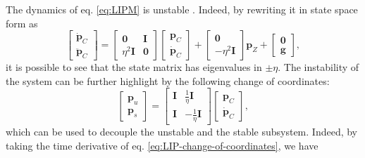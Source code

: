 The dynamics of eq. \eqref{eq:LIPM} is unstable \cite{Scianca2020TRO}. Indeed,
by rewriting it in state space form as
\begin{equation}
    \label{eq:LIPM-state-space}
    \begin{bmatrix}
        \dot{\bm{p}}_C \\ \ddot{\bm{p}}_C
    \end{bmatrix}
    =
    \begin{bmatrix}
        \bm{0}        & \bm{I} \\
        \eta^2 \bm{I} & \bm{0}
    \end{bmatrix}
    \begin{bmatrix}
        \bm{p}_C \\ \dot{\bm{p}}_C
    \end{bmatrix}
    +
    \begin{bmatrix}
        \bm{0} \\ -\eta^2 \bm{I}
    \end{bmatrix}
    \bm{p}_Z 
    +
    \begin{bmatrix}
        \bm{0} \\ \bm{g}
    \end{bmatrix},
\end{equation}
it is possible to see that the state matrix has eigenvalues in $\pm\eta$.
The instability of the system
can be further highlight by the following change of coordinates:
\begin{equation}
    \label{eq:LIP-change-of-coordinates}
    \begin{bmatrix}
        \bm{p}_u \\ \bm{p}_s
    \end{bmatrix}
    =
    \begin{bmatrix}
        \bm{I} &  \frac{1}{\eta} \bm{I} \\
        \bm{I} & -\frac{1}{\eta} \bm{I}
    \end{bmatrix}
    \begin{bmatrix}
        \bm{p}_C\\ \dot{\bm{p}}_C
    \end{bmatrix},
\end{equation}
which can be used to decouple the unstable and the stable subsystem. Indeed,
by taking the time derivative of eq. \eqref{eq:LIP-change-of-coordinates}, we
have


